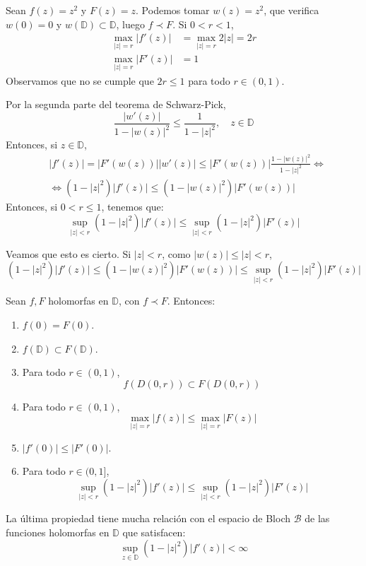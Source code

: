 \begin{example}[Contraejemplo]
    Sean $f(z) = z^2$ y $F(z) = z$.
    Podemos tomar $w(z) = z^2$, que verifica $w(0) = 0$ y $w(\mathbb{D}) \subset \mathbb{D}$, luego $f \prec F$.
    Si $0 < r < 1$,
    \begin{align*}
        \max_{|z|=r} |f'(z)| & = \max_{|z|=r} 2|z| = 2r \\
        \max_{|z|=r} |F'(z)| & = 1
    \end{align*}
    Observamos que no se cumple que $2r \leq 1$ para todo $r \in (0, 1)$.
\end{example}

Por la segunda parte del teorema de Schwarz-Pick,
$$\frac{|w'(z)|}{1-|w(z)|^2} \leq \frac{1}{1-|z|^2}, \quad z \in \mathbb{D}$$
Entonces, si $z \in \mathbb{D}$,
\begin{align*}
     & |f'(z)| = |F'(w(z))||w'(z)| \leq |F'(w(z))|\frac{1-|w(z)|^2}{1-|z|^2} \Leftrightarrow \\
     & \Leftrightarrow (1-|z|^2)|f'(z)| \leq (1-|w(z)|^2)|F'(w(z))|
\end{align*}
Entonces, si $0 < r \leq 1$, tenemos que:
$$\sup_{|z|<r} (1-|z|^2)|f'(z)| \leq \sup_{|z|<r} (1-|z|^2)|F'(z)|$$

Veamos que esto es cierto.
Si $|z| < r$, como $|w(z)| \leq |z| < r$,
$$(1-|z|^2)|f'(z)| \leq (1-|w(z)|^2)|F'(w(z))| \leq \sup_{|z|<r} (1-|z|^2)|F'(z)|$$

\begin{proposition}
    Sean $f, F$ holomorfas en $\mathbb{D}$, con $f \prec F$.
    Entonces:
    \begin{enumerate}
        \item $f(0) = F(0)$.
        \item $f(\mathbb{D}) \subset F(\mathbb{D})$.
        \item Para todo $r \in (0, 1)$,
              $$f(D(0, r)) \subset F(D(0, r))$$
        \item Para todo $r \in (0, 1)$,
              $$\max_{|z|=r} |f(z)| \leq \max_{|z|=r} |F(z)|$$
        \item $|f'(0)| \leq |F'(0)|$.
        \item Para todo $r \in (0, 1]$,
              $$\sup_{|z|<r} (1-|z|^2)|f'(z)| \leq \sup_{|z|<r} (1-|z|^2)|F'(z)|$$
    \end{enumerate}
\end{proposition}

La última propiedad tiene mucha relación con el espacio de Bloch $\mathcal{B}$ de las funciones holomorfas en $\mathbb{D}$ que satisfacen:
$$\sup_{z \in \mathbb{D}} (1-|z|^2)|f'(z)| < \infty$$

